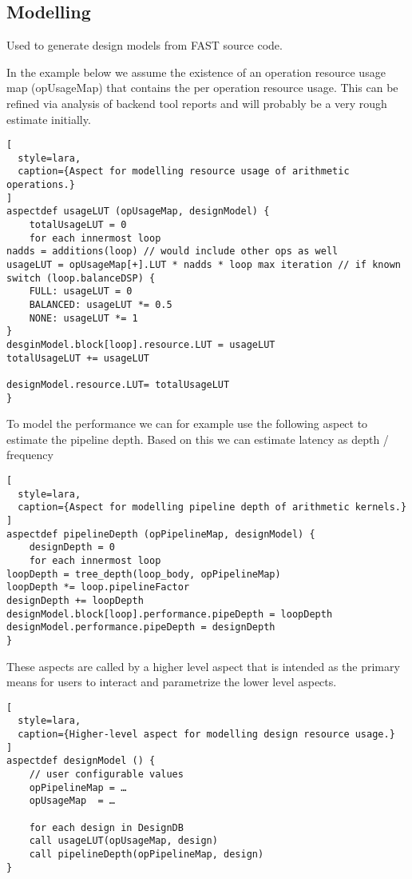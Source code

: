 \subsection{Modelling}

Used to generate design models from FAST source code.

In the example below we assume the existence of an operation resource
usage map (opUsageMap) that contains the per operation resource
usage. This can be refined via analysis of backend tool reports and
will probably be a very rough estimate initially.

\begin{lstlisting}[
  style=lara,
  caption={Aspect for modelling resource usage of arithmetic operations.}
]
aspectdef usageLUT (opUsageMap, designModel) {
	totalUsageLUT = 0
	for each innermost loop
nadds = additions(loop) // would include other ops as well
usageLUT = opUsageMap[+].LUT * nadds * loop max iteration // if known
switch (loop.balanceDSP) {
	FULL: usageLUT = 0
	BALANCED: usageLUT *= 0.5
	NONE: usageLUT *= 1
}
desginModel.block[loop].resource.LUT = usageLUT
totalUsageLUT += usageLUT

designModel.resource.LUT= totalUsageLUT
}
\end{lstlisting}

To model the performance we can for example use the following aspect
to estimate the pipeline depth. Based on this we can estimate latency
as depth / frequency

\begin{lstlisting}[
  style=lara,
  caption={Aspect for modelling pipeline depth of arithmetic kernels.}
]
aspectdef pipelineDepth (opPipelineMap, designModel) {
	designDepth = 0
	for each innermost loop
loopDepth = tree_depth(loop_body, opPipelineMap)
loopDepth *= loop.pipelineFactor
designDepth += loopDepth
designModel.block[loop].performance.pipeDepth = loopDepth
designModel.performance.pipeDepth = designDepth
}
\end{lstlisting}

These aspects are called by a higher level aspect that is intended as
the primary means for users to interact and parametrize the lower
level aspects.

\begin{lstlisting}[
  style=lara,
  caption={Higher-level aspect for modelling design resource usage.}
]
aspectdef designModel () {
	// user configurable values
	opPipelineMap = …
	opUsageMap  = …

	for each design in DesignDB
	call usageLUT(opUsageMap, design)
	call pipelineDepth(opPipelineMap, design)
}
\end{lstlisting}

